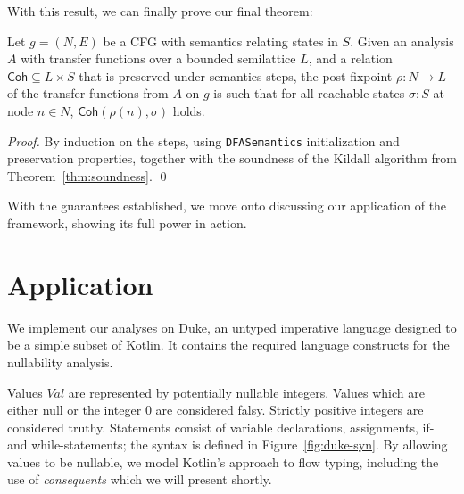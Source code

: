\documentclass[runningheads]{llncs}
\newcommand{\coh}{\mathsf{Coh}}
\newcommand{\Val}{\mathit{Val}}
\newcommand{\lean}[1]{\lstinline[language=Lean]|#1|}
\begin{document}

With this result, we can finally prove our final theorem: 
\begin{theorem}\label{thm:framework}
Let $g = (N, E)$ be a CFG with semantics relating states in $S$. Given an analysis $A$ with transfer functions over a bounded semilattice $L$, and a relation $\coh \subseteq L \times S$ that is preserved under semantics steps, the post-fixpoint $\rho : N \to L$ of the transfer functions from $A$ on $g$ is such that for all reachable states $\sigma : S$ at node $n \in N$, $\coh(\rho(n), \sigma)$ holds.
\end{theorem}

\begin{proof}
By induction on the steps, using \lean{DFASemantics} initialization and preservation properties, together with the soundness of the Kildall algorithm from Theorem~\ref{thm:soundness}. \qed
\end{proof}

With the guarantees established, we move onto discussing our application of the framework, showing its full power in action.

\section{Application}
\label{sec:appl}

We implement our analyses on Duke, an untyped imperative language designed to be a simple subset of Kotlin. It contains the required language constructs for the nullability analysis.

Values $\Val$ are represented by potentially nullable integers. Values which are either null or the integer 0 are considered falsy. Strictly positive integers are considered truthy. Statements consist of variable declarations, assignments, if- and while-statements; the syntax is defined in Figure~\ref{fig:duke-syn}. By allowing values to be nullable, we model Kotlin's approach to flow typing, including the use of \emph{consequents} which we will present shortly.
\end{document}
